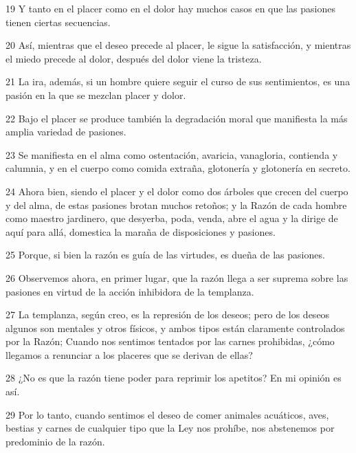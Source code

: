 \par 19 Y tanto en el placer como en el dolor hay muchos casos en que las pasiones tienen ciertas secuencias.

\par 20 Así, mientras que el deseo precede al placer, le sigue la satisfacción, y mientras el miedo precede al dolor, después del dolor viene la tristeza.

\par 21 La ira, además, si un hombre quiere seguir el curso de sus sentimientos, es una pasión en la que se mezclan placer y dolor.

\par 22 Bajo el placer se produce también la degradación moral que manifiesta la más amplia variedad de pasiones.

\par 23 Se manifiesta en el alma como ostentación, avaricia, vanagloria, contienda y calumnia, y en el cuerpo como comida extraña, glotonería y glotonería en secreto.

\par 24 Ahora bien, siendo el placer y el dolor como dos árboles que crecen del cuerpo y del alma, de estas pasiones brotan muchos retoños; y la Razón de cada hombre como maestro jardinero, que desyerba, poda, venda, abre el agua y la dirige de aquí para allá, domestica la maraña de disposiciones y pasiones.

\par 25 Porque, si bien la razón es guía de las virtudes, es dueña de las pasiones.

\par 26 Observemos ahora, en primer lugar, que la razón llega a ser suprema sobre las pasiones en virtud de la acción inhibidora de la templanza.

\par 27 La templanza, según creo, es la represión de los deseos; pero de los deseos algunos son mentales y otros físicos, y ambos tipos están claramente controlados por la Razón; Cuando nos sentimos tentados por las carnes prohibidas, ¿cómo llegamos a renunciar a los placeres que se derivan de ellas?

\par 28 ¿No es que la razón tiene poder para reprimir los apetitos? En mi opinión es así.

\par 29 Por lo tanto, cuando sentimos el deseo de comer animales acuáticos, aves, bestias y carnes de cualquier tipo que la Ley nos prohíbe, nos abstenemos por predominio de la razón.

